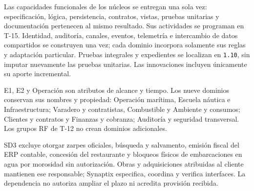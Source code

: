 Las capacidades funcionales de los núcleos se entregan una sola vez: especificación, lógica, persistencia, contratos, vistas, pruebas unitarias y documentación pertenecen al mismo resultado. Sus actividades se programan en T-15. Identidad, auditoría, canales, eventos, telemetría e intercambio de datos compartidos se construyen una vez; cada dominio incorpora solamente sus reglas y adaptación particular. Pruebas integrales y expedientes se localizan en \texttt{1.10}, sin imputar nuevamente las pruebas unitarias. Las innovaciones incluyen únicamente su aporte incremental.

E1, E2 y Operación son atributos de alcance y tiempo. Los nueve dominios conservan sus nombres y propiedad: Operación marítima, Escuela náutica e Infraestructura; Varadero y contratistas, Combustible y Ambiente y consumos; Clientes y contratos y Finanzas y cobranza; Auditoría y seguridad transversal. Los grupos RF de T-12 no crean dominios adicionales.

SD3 excluye otorgar zarpes oficiales, búsqueda y salvamento, emisión fiscal del ERP contable, concesión del restaurante y bloqueos físicos de embarcaciones en agua por morosidad sin autorización. Obras y adquisiciones atribuidas al cliente mantienen ese responsable; Synaptix especifica, coordina y verifica interfaces. La dependencia no autoriza ampliar el plazo ni acredita provisión recibida.

